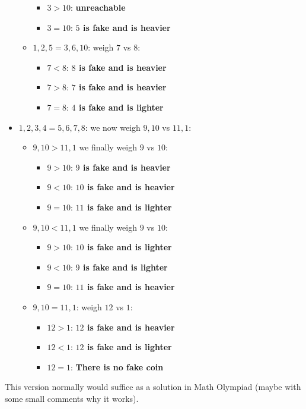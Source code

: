 \begin{problem}
\begin{itemize}
\begin{itemize}
\begin{itemize}
				\item $3>10$: \textbf{unreachable}
				\item $3=10$: \textbf{$5$ is fake and is heavier}
			\end{itemize}	
		\item $1,2,5 = 3,6,10$: weigh $7$ vs $8$:
			\begin{itemize}
				\item $7<8$: \textbf{$8$ is fake and is heavier}
				\item $7>8$: \textbf{$7$ is fake and is heavier}
				\item $7=8$: \textbf{$4$ is fake and is lighter}
			\end{itemize}	
	\end{itemize} 
\item $1,2,3,4 = 5,6,7,8$: we now weigh $9,10$ vs $11,1$:
	\begin{itemize}
		\item $9,10 > 11,1$ we finally weigh $9$ vs $10$:
			\begin{itemize}
				\item $9>10$: \textbf{$9$ is fake and is heavier}
				\item $9<10$: \textbf{$10$ is fake and is heavier}
				\item $9=10$: \textbf{$11$ is fake and is lighter}
			\end{itemize}
		\item $9,10 < 11,1$ we finally weigh $9$ vs $10$:
			\begin{itemize}
				\item $9>10$: \textbf{$10$ is fake and is lighter}
				\item $9<10$: \textbf{$9$ is fake and is lighter}
				\item $9=10$: \textbf{$11$ is fake and is heavier}
			\end{itemize}
		\item $9,10 = 11,1$: weigh $12$ vs $1$:
			\begin{itemize}
				\item $12>1$: \textbf{$12$ is fake and is heavier}
				\item $12<1$: \textbf{$12$ is fake and is lighter}
				\item $12=1$: \textbf{There is no fake coin}
			\end{itemize}	
	\end{itemize} 
\end{itemize}

This version normally would suffice as a solution in Math Olympiad (maybe with some small comments why it works).


\end{problem}
